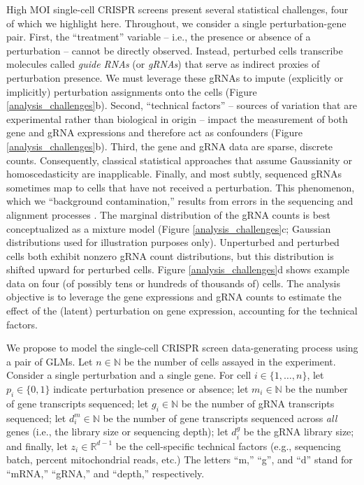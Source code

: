 \documentclass[12pt]{article}
\begin{document}
High MOI single-cell CRISPR screens present several statistical challenges, four of which we highlight here. Throughout, we consider a single perturbation-gene pair. First, the ``treatment'' variable -- i.e., the presence or absence of a perturbation -- cannot be directly observed. Instead, perturbed cells transcribe molecules called  \textit{guide RNAs} (or \textit{gRNAs}) that serve as indirect proxies of perturbation presence. We must leverage these gRNAs to impute (explicitly or implicitly) perturbation assignments onto the cells (Figure \ref{analysis_challenges}b). Second, ``technical factors'' -- sources of variation that are experimental rather than biological in origin -- impact the measurement of both gene and gRNA expressions and therefore act as confounders (Figure \ref{analysis_challenges}b). Third, the gene and gRNA data are sparse, discrete counts. Consequently, classical statistical approaches that assume Gaussianity or homoscedasticity are inapplicable. Finally, and most subtly, sequenced gRNAs sometimes map to cells that have not received a perturbation. This phenomenon, which we ``background contamination,'' results from errors in the sequencing and alignment processes \parencite{Replogle2020}. The marginal distribution of the gRNA counts is best conceptualized as a mixture model (Figure \ref{analysis_challenges}c; Gaussian distributions used for illustration purposes only). Unperturbed and perturbed cells both exhibit nonzero gRNA count distributions, but this distribution is shifted upward for perturbed cells. Figure \ref{analysis_challenges}d shows example data on four (of possibly tens or hundreds of thousands of) cells. The analysis objective is to leverage the gene expressions and gRNA counts to estimate the effect of the (latent) perturbation on gene expression, accounting for the technical factors.

We propose to model the single-cell CRISPR screen data-generating process using a pair of GLMs. Let $n \in \mathbb{N}$ be the number of cells assayed in the experiment. Consider a single perturbation and a single gene. For cell $i \in \{1, \dots, n\}$, let $p_i \in \{0,1\}$ indicate perturbation presence or absence; let $m_i \in \mathbb{N}$ be the number of gene transcripts sequenced; let $g_i \in \mathbb{N}$ be the number of gRNA transcripts sequenced; let $d^m_i \in \mathbb{N}$ be the number of gene transcripts sequenced across \textit{all} genes (i.e., the library size or sequencing depth); let $d^g_i$ be the gRNA library size; and finally, let $z_i \in \mathbb{R}^{d-1}$ be the cell-specific technical factors (e.g., sequencing batch, percent mitochondrial reads, etc.) The letters ``m,'' ``g'', and ``d'' stand for ``mRNA,'' ``gRNA,'' and ``depth,'' respectively.
\end{document}
